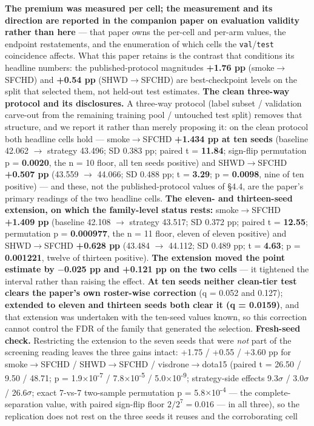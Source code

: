 \documentclass[pdflatex,sn-mathphys-ay]{sn-jnl}
\begin{document}
\textbf{The premium was measured per cell; the measurement and its direction are reported in the companion paper on evaluation validity rather than here} --- that paper owns the per-cell and per-arm values, the endpoint restatements, and the enumeration of which cells the \texttt{val}/\texttt{test} coincidence affects. What this paper retains is the contrast that conditions its headline numbers: the published-protocol magnitudes \textbf{+1.76 pp} (smoke\ensuremath{\rightarrow}SFCHD) and \textbf{+0.54 pp} (SHWD\ensuremath{\rightarrow}SFCHD) are best-checkpoint levels on the split that selected them, not held-out test estimates. \textbf{The clean three-way protocol and its disclosures.} A three-way protocol (label subset / validation carve-out from the remaining training pool / untouched test split) removes that structure, and we report it rather than merely proposing it: on the clean protocol both headline cells hold --- smoke\ensuremath{\rightarrow}SFCHD \textbf{+1.434 pp at ten seeds} (baseline 42.062 \ensuremath{\rightarrow} strategy 43.496; SD 0.383 pp; paired t = \textbf{11.84}; sign-flip permutation p = \textbf{0.0020}, the n = 10 floor, all ten seeds positive) and SHWD\ensuremath{\rightarrow}SFCHD \textbf{+0.507 pp} (43.559 \ensuremath{\rightarrow} 44.066; SD 0.488 pp; t = \textbf{3.29}; p = \textbf{0.0098}, nine of ten positive) --- and these, not the published-protocol values of \S{}4.4, are the paper's primary readings of the two headline cells. \textbf{The eleven- and thirteen-seed extension, on which the family-level status rests:} smoke\ensuremath{\rightarrow}SFCHD \textbf{+1.409 pp} (baseline 42.108 \ensuremath{\rightarrow} strategy 43.517; SD 0.372 pp; paired t = \textbf{12.55}; permutation p = \textbf{0.000977}, the n = 11 floor, eleven of eleven positive) and SHWD\ensuremath{\rightarrow}SFCHD \textbf{+0.628 pp} (43.484 \ensuremath{\rightarrow} 44.112; SD 0.489 pp; t = \textbf{4.63}; p = \textbf{0.001221}, twelve of thirteen positive). \textbf{The extension moved the point estimate by \ensuremath{-}0.025 pp and +0.121 pp on the two cells} --- it tightened the interval rather than raising the effect. \textbf{At ten seeds neither clean-tier test clears the paper's own roster-wise correction} (q = 0.052 and 0.127); \textbf{extended to eleven and thirteen seeds both clear it (q = 0.0159)}, and that extension was undertaken with the ten-seed values known, so this correction cannot control the FDR of the family that generated the selection. \textbf{Fresh-seed check.} Restricting the extension to the seven seeds that were \emph{not} part of the screening reading leaves the three gains intact: +1.75 / +0.55 / +3.60 pp for smoke\ensuremath{\rightarrow}SFCHD / SHWD\ensuremath{\rightarrow}SFCHD / visdrone\ensuremath{\rightarrow}dota15 (paired t = 26.50 / 9.50 / 48.71; p = 1.9\ensuremath{\times}10\textsuperscript{-7} / 7.8\ensuremath{\times}10\textsuperscript{-5} / 5.0\ensuremath{\times}10\textsuperscript{-9}; strategy-side effects 9.3\ensuremath{\sigma} / 3.0\ensuremath{\sigma} / 26.6\ensuremath{\sigma}; exact 7-vs-7 two-sample permutation p = 5.8\ensuremath{\times}10\textsuperscript{-4} --- the complete-separation value, with paired sign-flip floor $2/2^7=0.016$ --- in all three), so the replication does not rest on the three seeds it reuses and the corroborating cell 
\end{document}
